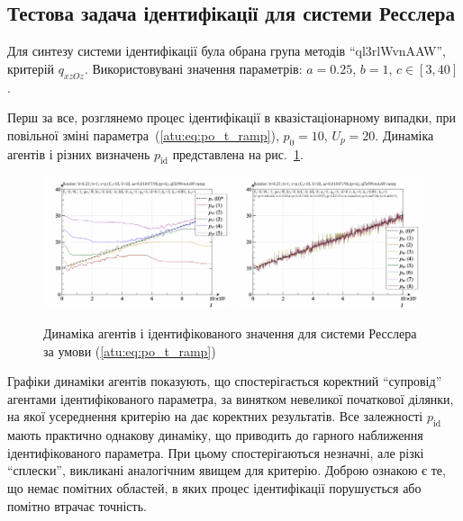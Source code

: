 
\subsection{Тестова задача ідентифікації для системи Ресслера} %

Для синтезу системи ідентифікації була обрана група методів
``ql3rlWvnAAW'', критерій
$ q_{xzOz} $.
Використовувані значення параметрів:
$ a = 0.25 $,
$ b = 1 $,
$ c \in [3, 40] $.

Перш за все, розглянемо процес ідентифікації
в квазістаціонарному випадки, при повільної зміні
параметра~(\ref{atu:eq:po_t_ramp}),
$ p_0 = 10 $,
$ U_p = 20 $. Динаміка агентів і різних визначень
$ p_\mathrm{id} $ представлена на рис.~\ref{atu:f:ross_id_ramp}.


\begin{figure}[ht!]
\begin{center}
  \includegraphics[width=0.49\textwidth]{p/cha/ross/ross_id-p_t_pi_ql3rlWvnAAW_ramp.png}
  \hfill
  \includegraphics[width=0.49\textwidth]{p/cha/ross/ross_id-p_t_p_ql3rlWvnAAW_ramp.png}
\end{center}
\caption{Динаміка агентів і ідентифікованого значення для системи Ресслера за умови (\ref{atu:eq:po_t_ramp})}
\label{atu:f:ross_id_ramp}
\end{figure}

Графіки динаміки агентів показують, що спостерігається коректний
``супровід'' агентами ідентифікованого параметра, за винятком
невеликої початкової ділянки, на якої усереднення критерію
на дає коректних результатів. Все залежності
$ p_\mathrm{id} $ мають практично однакову динаміку,
що приводить до гарного наближення ідентифікованого параметра. При цьому
спостерігаються незначні, але різкі ``сплески'', викликані
аналогічним явищем для критерію. Доброю ознакою є те, що
немає помітних областей, в яких процес ідентифікації
порушується або помітно втрачає точність.

